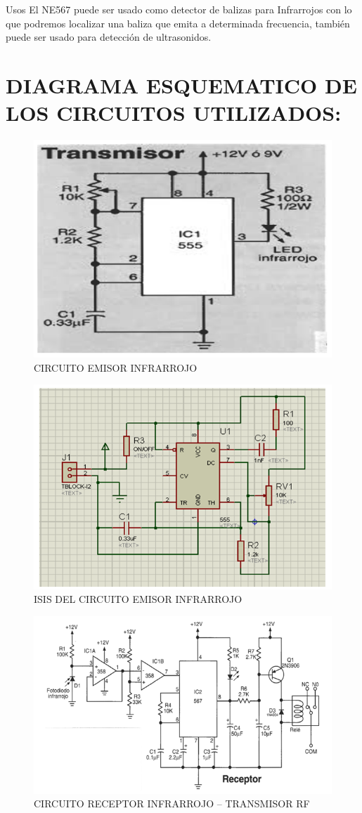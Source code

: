 \documentclass[a4paper,11pt]{article}
\begin{document}
Usos
El NE567 puede ser usado como detector de balizas para Infrarrojos con lo que podremos localizar una baliza que emita a determinada frecuencia, también puede ser usado para detección de ultrasonidos.

\newpage
\section{DIAGRAMA ESQUEMATICO DE LOS CIRCUITOS UTILIZADOS:}

	\begin{figure}[h]
		\caption{CIRCUITO EMISOR INFRARROJO}
		\centering
		\includegraphics[width=0.5\linewidth]{./10}
	\end{figure}

	\begin{figure}[h]
		\caption{ISIS DEL CIRCUITO EMISOR INFRARROJO}
		\centering
		\includegraphics[width=0.6\linewidth]{./11}
	\end{figure}

	\begin{figure}[h]
		\caption{CIRCUITO RECEPTOR INFRARROJO – TRANSMISOR RF}
		\centering
		\includegraphics[width=0.6\linewidth]{./12}
	\end{figure}
	
\end{document}

